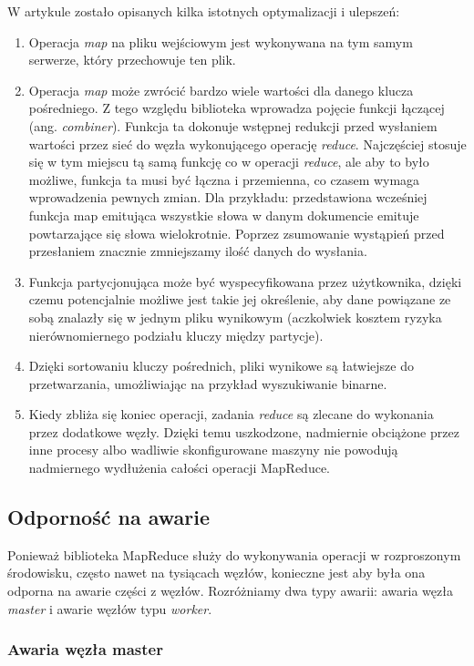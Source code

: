 W artykule \cite{google-mapreduce} zostało opisanych kilka istotnych optymalizacji i ulepszeń:

\begin{enumerate}
 \item Operacja \emph{map} na pliku wejściowym jest wykonywana na tym samym serwerze, który przechowuje ten plik.
 \item Operacja \emph{map} może zwrócić bardzo wiele wartości dla danego klucza pośredniego.
 Z tego względu biblioteka wprowadza pojęcie funkcji łączącej (ang. \emph{combiner}).
 Funkcja ta dokonuje wstępnej redukcji przed wysłaniem wartości przez sieć do węzła wykonującego operację \emph{reduce}.
 Najczęściej stosuje się w tym miejscu tą samą funkcję co w operacji \emph{reduce}, ale aby to było możliwe, funkcja ta musi być łączna i przemienna, co czasem wymaga wprowadzenia pewnych zmian.
 Dla przykładu: przedstawiona wcześniej funkcja map emitująca wszystkie słowa w danym dokumencie emituje powtarzające się słowa wielokrotnie.
 Poprzez zsumowanie wystąpień przed przesłaniem znacznie zmniejszamy ilość danych do wysłania.
 \item Funkcja partycjonująca może być wyspecyfikowana przez użytkownika, dzięki czemu potencjalnie możliwe jest takie jej określenie, aby dane powiązane ze sobą znalazły się w jednym pliku wynikowym (aczkolwiek kosztem ryzyka nierównomiernego podziału kluczy między partycje).
 \item Dzięki sortowaniu kluczy pośrednich, pliki wynikowe są łatwiejsze do przetwarzania, umożliwiając na przykład wyszukiwanie binarne.
 \item Kiedy zbliża się koniec operacji, zadania \emph{reduce} są zlecane do wykonania przez dodatkowe węzły.
 Dzięki temu uszkodzone, nadmiernie obciążone przez inne procesy albo wadliwie skonfigurowane maszyny nie powodują nadmiernego wydłużenia całości operacji MapReduce.
\end{enumerate}

\subsection*{Odporność na awarie}

Ponieważ biblioteka MapReduce służy do wykonywania operacji w rozproszonym środowisku, często nawet na tysiącach węzłów, konieczne jest aby była ona odporna na awarie części z węzłów.
Rozróżniamy dwa typy awarii: awaria węzła \emph{master} i awarie węzłów typu \emph{worker}.

\subsubsection*{Awaria węzła master}

